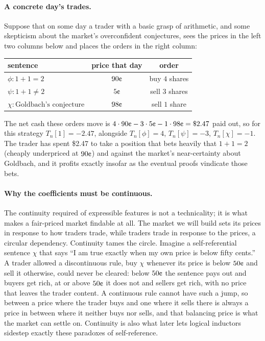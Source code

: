 \documentclass[10pt]{article}
\theoremstyle{definition}
\theoremstyle{remark}
\begin{document}
\paragraph{A concrete day's trades.} Suppose that on some day a trader with a basic grasp of arithmetic, and some skepticism about the market's overconfident conjectures, sees the prices in the left two columns below and places the orders in the right column:
\begin{center}
\begin{tabular}{lcc}
\toprule
sentence & price that day & order \\
\midrule
$\phi : 1+1=2$ & $90\text{\textcent}$ & buy $4$ shares \\
$\psi : 1+1 \ne 2$ & $5\text{\textcent}$ & sell $3$ shares \\
$\chi : \text{Goldbach's conjecture}$ & $98\text{\textcent}$ & sell $1$ share \\
\bottomrule
\end{tabular}
\end{center}
The net cash these orders move is $4 \cdot 90\text{\textcent} - 3 \cdot 5\text{\textcent} - 1 \cdot 98\text{\textcent} = \$2.47$ paid out, so for this strategy $T_n[1] = -2.47$, alongside $T_n[\phi]=4$, $T_n[\psi]=-3$, $T_n[\chi]=-1$. The trader has spent \$2.47 to take a position that bets heavily that $1+1=2$ (cheaply underpriced at $90\text{\textcent}$) and against the market's near-certainty about Goldbach, and it profits exactly insofar as the eventual proofs vindicate those bets.

\paragraph{Why the coefficients must be continuous.} The continuity required of expressible features is not a technicality; it is what makes a fair-priced market findable at all. The market we will build sets its prices in response to how traders trade, while traders trade in response to the prices, a circular dependency. Continuity tames the circle. Imagine a self-referential sentence $\chi$ that says ``I am true exactly when my own price is below fifty cents.'' A trader allowed a discontinuous rule, buy $\chi$ whenever its price is below $50\text{\textcent}$ and sell it otherwise, could never be cleared: below $50\text{\textcent}$ the sentence pays out and buyers get rich, at or above $50\text{\textcent}$ it does not and sellers get rich, with no price that leaves the trader content. A continuous rule cannot have such a jump, so between a price where the trader buys and one where it sells there is always a price in between where it neither buys nor sells, and that balancing price is what the market can settle on. Continuity is also what later lets logical inductors sidestep exactly these paradoxes of self-reference.
\end{document}
